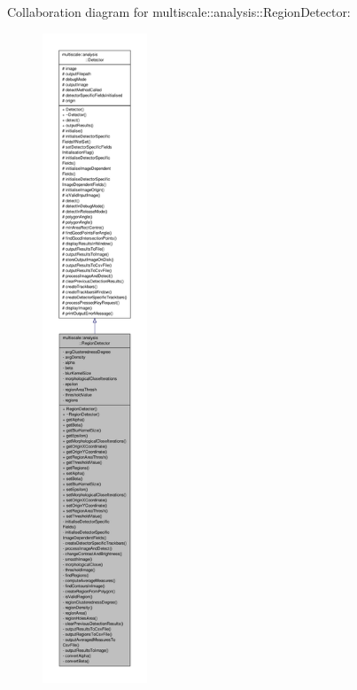 Collaboration diagram for multiscale\-:\-:analysis\-:\-:Region\-Detector\-:
\nopagebreak
\begin{figure}[H]
\begin{center}
\leavevmode
\includegraphics[height=550pt]{classmultiscale_1_1analysis_1_1RegionDetector__coll__graph}
\end{center}
\end{figure}

